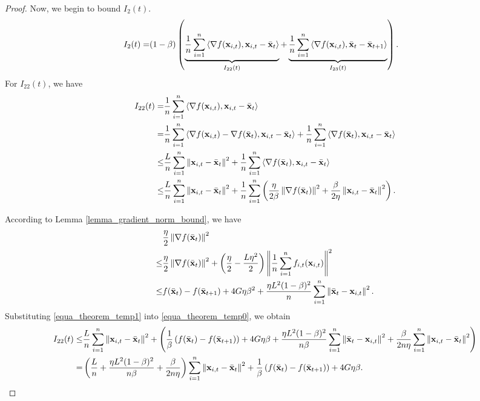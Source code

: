 \documentclass{article}
\begin{document}
\begin{proof}
Now, we begin to bound $I_2(t)$.
\begin{align}
\nonumber
I_2(t) = & (1-\beta) \left( \underbrace{ \frac{1}{n}\sum_{i=1}^n\left\langle\nabla f({\bf x}_{i,t}), {\bf x}_{i,t} - \bar{{\bf x}}_t  \right\rangle }_{I_{22}(t)} +  \underbrace{ \frac{1}{n}\sum_{i=1}^n\left\langle\nabla f({\bf x}_{i,t}), \bar{{\bf x}}_t - \bar{{\bf x}}_{t+1}  \right\rangle}_{I_{23}(t)} \right).
\end{align} For $I_{22}(t)$, we have
\begin{align}
\nonumber
I_{22}(t) = & \frac{1}{n}\sum_{i=1}^n\left\langle\nabla f({\bf x}_{i,t}), {\bf x}_{i,t} - \bar{{\bf x}}_t  \right\rangle \\ \nonumber
= & \frac{1}{n}\sum_{i=1}^n\left\langle\nabla f({\bf x}_{i,t}) - \nabla f(\bar{{\bf x}}_t), {\bf x}_{i,t} - \bar{{\bf x}}_t  \right\rangle + \frac{1}{n}\sum_{i=1}^n\left\langle\nabla f(\bar{{\bf x}}_t), {\bf x}_{i,t} - \bar{{\bf x}}_t  \right\rangle \\ \nonumber
\le & \frac{L}{n}\sum_{i=1}^n \left\lVert{\bf x}_{i,t} - \bar{{\bf x}}_t\right\rVert^2 + \frac{1}{n}\sum_{i=1}^n\left\langle\nabla f(\bar{{\bf x}}_t), {\bf x}_{i,t} - \bar{{\bf x}}_t  \right\rangle \\ \label{equa_theorem_temp0}
\le & \frac{L}{n}\sum_{i=1}^n \left\lVert{\bf x}_{i,t} - \bar{{\bf x}}_t\right\rVert^2 + \frac{1}{n}\sum_{i=1}^n\left( \frac{\eta}{2\beta}\left\lVert\nabla f(\bar{{\bf x}}_t)\right\rVert^2 + \frac{\beta}{2\eta}\left\lVert{\bf x}_{i,t} - \bar{{\bf x}}_t \right\rVert^2  \right).
\end{align}

According to Lemma \ref{lemma_gradient_norm_bound}, we have
\begin{align}
\nonumber
& \frac{\eta}{2}\left\lVert\nabla f(\bar{{\bf x}}_t)\right\rVert^2  \\ \nonumber
\le & \frac{\eta}{2}\left\lVert\nabla f(\bar{{\bf x}}_t)\right\rVert^2 + \left( \frac{\eta}{2} - \frac{L\eta^2}{2} \right)\left\lVert\frac{1}{n}\sum_{i=1}^n f_{i,t}({\bf x}_{i,t})\right\rVert^2 \\ \label{equa_theorem_temp1}
\le & f(\bar{{\bf x}}_t) - f(\bar{{\bf x}}_{t+1}) + 4G\eta\beta^2 +  \frac{\eta L^2(1-\beta)^2}{n}\sum_{i=1}^n\left\lVert\bar{{\bf x}}_t - {\bf x}_{i,t} \right\rVert^2.
\end{align} Substituting \eqref{equa_theorem_temp1} into \eqref{equa_theorem_temp0}, we obtain
\begin{align}
\nonumber
I_{22}(t) \le & \frac{L}{n}\sum_{i=1}^n \left\lVert{\bf x}_{i,t} - \bar{{\bf x}}_t\right\rVert^2 + \left(  \frac{1}{\beta}\left( f(\bar{{\bf x}}_t) - f(\bar{{\bf x}}_{t+1}) \right) + 4G\eta\beta +  \frac{\eta L^2(1-\beta)^2}{n\beta}\sum_{i=1}^n\left\lVert\bar{{\bf x}}_t - {\bf x}_{i,t} \right\rVert^2 + \frac{\beta}{2n\eta}\sum_{i=1}^n\left\lVert{\bf x}_{i,t} - \bar{{\bf x}}_t \right\rVert^2  \right) \\ \nonumber
= & \left(  \frac{L}{n} + \frac{\eta L^2(1-\beta)^2}{n\beta} + \frac{\beta}{2n\eta}  \right)\sum_{i=1}^n\left\lVert{\bf x}_{i,t} - \bar{{\bf x}}_t \right\rVert^2 + \frac{1}{\beta}\left( f(\bar{{\bf x}}_t) - f(\bar{{\bf x}}_{t+1}) \right) + 4G\eta\beta.
\end{align}


\end{proof}
\end{document}
